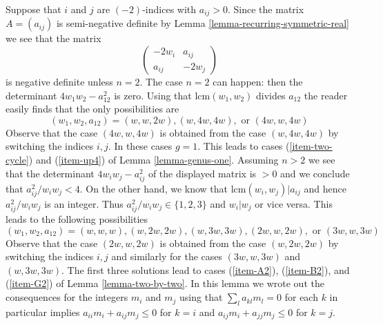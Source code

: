 \documentclass{stacks-project}
\theoremstyle{plain}
\theoremstyle{definition}
\theoremstyle{remark}
\numberwithin{equation}{subsection}
\begin{document}
\medskip\noindent
Suppose that $i$ and $j$ are $(-2)$-indices with $a_{ij} > 0$.
Since the matrix $A = (a_{ij})$ is semi-negative definite by
Lemma \ref{lemma-recurring-symmetric-real} we see that the matrix
$$
\left(
\begin{matrix}
-2w_i & a_{ij} \\
a_{ij} & -2w_j
\end{matrix}
\right)
$$
is negative definite unless $n = 2$. The case $n = 2$ can happen: then
the determinant $4w_1w_2 - a_{12}^2$ is zero. Using that
$\text{lcm}(w_1, w_2)$ divides $a_{12}$ the reader easily finds
that the only possibilities are
$$
(w_1, w_2, a_{12}) = (w, w, 2w), (w, 4w, 4w), \text{ or }(4w, w, 4w)
$$
Observe that the case $(4w, w, 4w)$ is obtained from the case
$(w, 4w, 4w)$ by switching the indices $i, j$.
In these cases $g = 1$. This leads to cases
(\ref{item-two-cycle}) and (\ref{item-up4}) of Lemma \ref{lemma-genus-one}.
Assuming $n > 2$ we see
that the determinant $4w_iw_j - a_{ij}^2$ of the displayed matrix
is $> 0$ and we conclude that $a_{ij}^2/w_iw_j < 4$.
On the other hand, we know that $\text{lcm}(w_i, w_j) | a_{ij}$
and hence $a_{ij}^2/w_iw_j$ is an integer.
Thus $a_{ij}^2/w_iw_j \in \{1, 2, 3\}$ and $w_i | w_j$ or
vice versa. This leads to the following possibilities
$$
(w_1, w_2, a_{12}) = (w, w, w), (w, 2w, 2w), (w, 3w, 3w),
(2w, w, 2w), \text{ or }(3w, w, 3w)
$$
Observe that the case $(2w, w, 2w)$ is obtained from the case
$(w, 2w, 2w)$ by switching the indices $i, j$ and similarly
for the cases $(3w, w, 3w)$ and $(w, 3w, 3w)$. The first three
solutions lead to cases (\ref{item-A2}), (\ref{item-B2}), and
(\ref{item-G2}) of Lemma \ref{lemma-two-by-two}. In this lemma
we wrote out the consequences for the integers $m_i$ and $m_j$
using that $\sum_l a_{kl}m_l = 0$ for each $k$ in particular implies
$a_{ii}m_i + a_{ij}m_j \leq 0$ for $k = i$ and
$a_{ij}m_i + a_{jj}m_j \leq 0$ for $k = j$.
\end{document}
